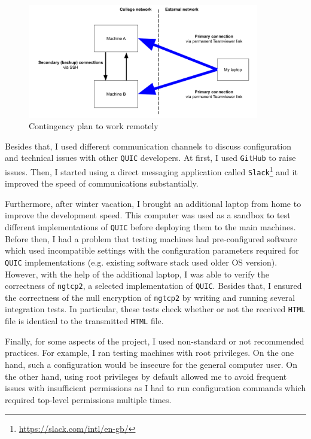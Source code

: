 \documentclass[12pt,a4paper,twoside,openright]{report}
\begin{document}
    \begin{figure}[ht]
    \centering
    \includegraphics[width=0.9\textwidth]{figs/Setup map.png}
    \caption{Contingency plan to work remotely}
    \label{fig:setup_map}
    \end{figure}

    Besides that, I used different communication channels to discuss configuration and technical issues with other \texttt{QUIC} developers.
    At first, I used \texttt{GitHub} to raise issues.
    Then, I started using a direct messaging application called \texttt{Slack}\footnote{\url{https://slack.com/intl/en-gb/}} 
    and it improved the speed of communications substantially.

    Furthermore, after winter vacation, I brought an additional laptop from home to improve the development speed.
    This computer was used as a sandbox to test different implementations of \texttt{QUIC} before deploying them to the main machines.
    Before then, I had a problem that testing machines had pre-configured software which used incompatible settings with the configuration parameters required for \texttt{QUIC} implementations (e.g. existing software stack used older OS version).
    However, with the help of the additional laptop, I was able to verify the correctness of \texttt{ngtcp2}, a selected implementation of \texttt{QUIC}.
    Besides that, I ensured the correctness of the null encryption of \texttt{ngtcp2} by writing and running several integration tests.
    In particular, these tests check whether or not the received \texttt{HTML} file is identical to the transmitted \texttt{HTML} file.
    
    Finally, for some aspects of the project, I used non-standard or not recommended practices.
    For example, I ran testing machines with root privileges.
    On the one hand, such a configuration would be insecure for the general computer user. On the other hand, using root privileges by default allowed me to avoid frequent issues with insufficient permissions as I had to run configuration commands which required top-level permissions multiple times.
    
\end{document}
